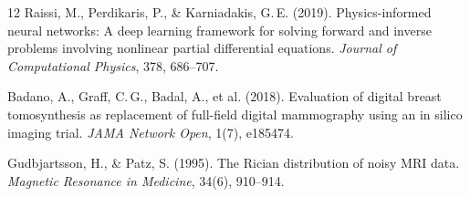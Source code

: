 \documentclass[12pt]{article}
\begin{document}
\begin{thebibliography}{12}
Raissi, M., Perdikaris, P., \& Karniadakis, G.\,E. (2019).
Physics-informed neural networks: A deep learning framework for solving forward and inverse problems involving nonlinear partial differential equations.
\textit{Journal of Computational Physics}, 378, 686--707.

Badano, A., Graff, C.\,G., Badal, A., et al. (2018).
Evaluation of digital breast tomosynthesis as replacement of full-field digital mammography using an in silico imaging trial.
\textit{JAMA Network Open}, 1(7), e185474.

Gudbjartsson, H., \& Patz, S. (1995).
The Rician distribution of noisy MRI data.
\textit{Magnetic Resonance in Medicine}, 34(6), 910--914.

\end{thebibliography}
\end{document}
